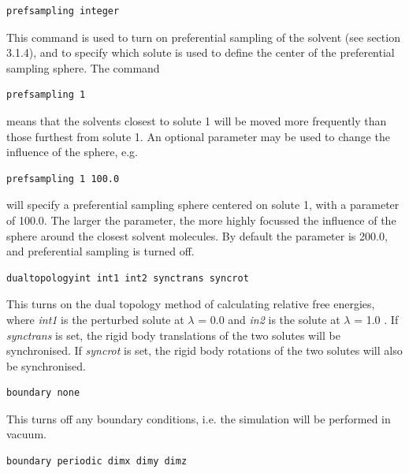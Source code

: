 \documentclass[letterpaper,10pt,english]{sphinxmanual}
\begin{document}
\begin{Verbatim}[commandchars=\\\{\}]
prefsampling integer
\end{Verbatim}

This command is used to turn on preferential sampling of the solvent (see section 3.1.4), and to specify which solute is used to define the center of the preferential sampling sphere. The command

\begin{Verbatim}[commandchars=\\\{\}]
prefsampling 1
\end{Verbatim}

means that the solvents closest to solute 1 will be moved more frequently than those furthest from solute 1. An optional parameter may be used to change the influence of the sphere, e.g.

\begin{Verbatim}[commandchars=\\\{\}]
prefsampling 1 100.0
\end{Verbatim}

will specify a preferential sampling sphere centered on solute 1, with a parameter of 100.0. The larger the parameter, the more highly focussed the influence of the sphere around the closest solvent molecules. By default the parameter is 200.0, and preferential sampling is turned off.

\begin{Verbatim}[commandchars=\\\{\}]
dualtopologyint int1 int2 synctrans syncrot
\end{Verbatim}

This turns on the dual topology method of calculating relative free energies, where \emph{int1} is the perturbed solute at \(\lambda\) = 0.0 and \emph{in2} is the solute at \(\lambda\) = 1.0 . If \emph{synctrans} is set, the rigid body translations of the two solutes will be synchronised. If \emph{syncrot} is set, the rigid body rotations of the two solutes will also be synchronised.

\begin{Verbatim}[commandchars=\\\{\}]
boundary none
\end{Verbatim}

This turns off any boundary conditions, i.e. the simulation will be performed in vacuum.

\begin{Verbatim}[commandchars=\\\{\}]
boundary periodic dimx dimy dimz
\end{Verbatim}
\end{document}
